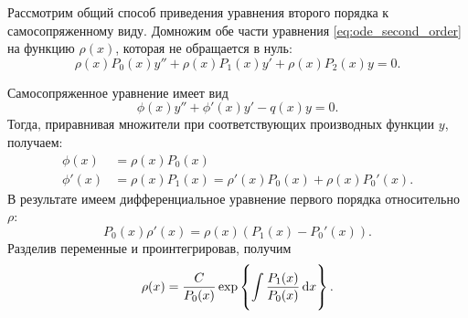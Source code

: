 Рассмотрим общий способ приведения уравнения второго порядка к самосопряженному виду.
Домножим обе части уравнения \eqref{eq:ode_second_order} на функцию $\rho(x)$, которая не обращается в нуль:
\[ \rho(x) P_0(x) y'' + \rho(x) P_1(x) y' + \rho(x) P_2(x) y = 0. \]

Самосопряженное уравнение имеет вид
\[ \phi(x) y'' + \phi'(x) y' - q(x) y = 0. \]
Тогда, приравнивая множители при соответствующих производных функции $y$, получаем:
\begin{align*}
    \phi(x) &= \rho(x) P_0(x) \\
    \phi'(x) &= \rho(x) P_1(x) = \rho'(x) P_0(x) + \rho(x) P_0'(x).
\end{align*}
В результате имеем дифференциальное уравнение первого порядка относительно $\rho$:
\[ P_0(x) \rho'(x) = \rho(x) (P_1(x) - P_0'(x)). \]
Разделив переменные и проинтегрировав, получим
\begin{equation}\label{eq:rho_self_adjoint}
    \rho(x) = \frac{C}{P_0(x)} \exp\left\{\int\limits_{}^{} \frac{P_1(x)}{P_0(x)} \,\mathrm{d}{x}\right\}.
\end{equation}
